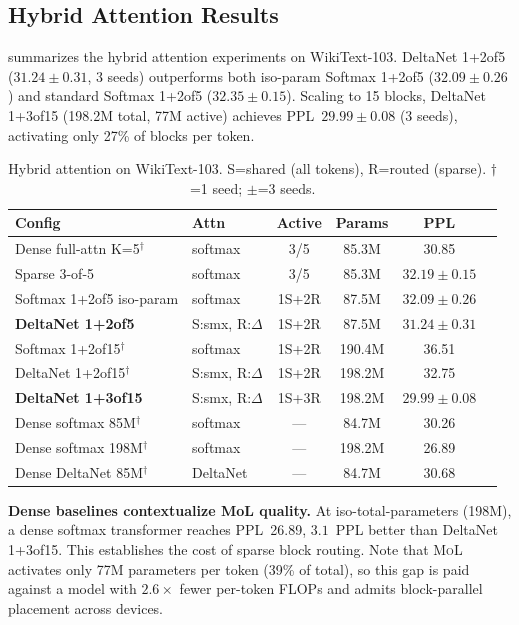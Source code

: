 \documentclass[10pt]{article}
\newcommand{\mol}{\textsc{MoL}}
\newcommand{\Paragraph}[1]{\vspace{0.5em}\noindent\textbf{#1}}
\begin{document}
\subsection{Hybrid Attention Results}

 summarizes the hybrid attention experiments on WikiText-103.
DeltaNet 1+2of5 ($31.24 \pm 0.31$, 3 seeds) outperforms both iso-param Softmax 1+2of5 ($32.09 \pm 0.26$) and standard Softmax 1+2of5 ($32.35 \pm 0.15$).
Scaling to 15 blocks, DeltaNet 1+3of15 (198.2M total, 77M active) achieves PPL~$\mathbf{29.99 \pm 0.08}$ (3 seeds), activating only 27\% of blocks per token.

\begin{table}[t]
\centering
\caption{Hybrid attention on WikiText-103. S=shared (all tokens), R=routed (sparse). $\dagger$=1 seed; $\pm$=3 seeds.}
\label{tab:hybrid_results}
\small
\begin{tabular}{llcccc}
\toprule
Config & Attn & Active & Params & PPL \\
\midrule
Dense full-attn K=5$^\dagger$ & softmax & 3/5 & 85.3M & 30.85 \\
Sparse 3-of-5 & softmax & 3/5 & 85.3M & $32.19 \pm 0.15$ \\
\midrule
Softmax 1+2of5 iso-param & softmax & 1S+2R & 87.5M & $32.09 \pm 0.26$ \\
\textbf{DeltaNet 1+2of5} & S:smx, R:$\Delta$ & 1S+2R & 87.5M & $\mathbf{31.24 \pm 0.31}$ \\
\midrule
Softmax 1+2of15$^\dagger$ & softmax & 1S+2R & 190.4M & 36.51 \\
DeltaNet 1+2of15$^\dagger$ & S:smx, R:$\Delta$ & 1S+2R & 198.2M & 32.75 \\
\textbf{DeltaNet 1+3of15} & S:smx, R:$\Delta$ & 1S+3R & 198.2M & $\mathbf{29.99 \pm 0.08}$ \\
\midrule
Dense softmax 85M$^\dagger$ & softmax & --- & 84.7M & 30.26 \\
Dense softmax 198M$^\dagger$ & softmax & --- & 198.2M & 26.89 \\
Dense DeltaNet 85M$^\dagger$ & DeltaNet & --- & 84.7M & 30.68 \\
\bottomrule
\end{tabular}
\end{table}

\Paragraph{Dense baselines contextualize MoL quality.}
At iso-total-parameters (198M), a dense softmax transformer reaches PPL~26.89, $3.1$~PPL better than DeltaNet 1+3of15. This establishes the cost of sparse block routing.
Note that \mol{} activates only 77M parameters per token (39\% of total), so this gap is paid against a model with $2.6\times$ fewer per-token FLOPs and admits block-parallel placement across devices.
\end{document}

